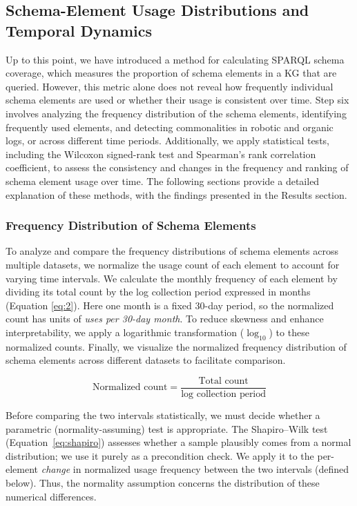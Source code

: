 \documentclass[sw]{iosart2x}
\begin{document}
\subsection{Schema-Element Usage Distributions and Temporal Dynamics}\label{sec:s6}
Up to this point, we have introduced a method for calculating SPARQL schema coverage, which measures the proportion of schema elements in a KG that are queried. However, this metric alone does not reveal how frequently individual schema elements are used or whether their usage is consistent over time. Step six involves analyzing the frequency distribution of the schema elements, identifying frequently used elements, and detecting commonalities in robotic and organic logs, or across different time periods. Additionally, we apply statistical tests, including the Wilcoxon signed-rank test and Spearman's rank correlation coefficient, to assess the consistency and changes in the frequency and ranking of schema element usage over time. The following sections provide a detailed explanation of these methods, with the findings presented in the Results section.

\subsubsection{Frequency Distribution of Schema Elements}\label{sec:s61}
To analyze and compare the frequency distributions of schema elements across multiple datasets, we normalize the usage count of each element to account for varying time intervals. We calculate the monthly frequency of each element by dividing its total count by the log collection period expressed in months (Equation \ref{eq:2}). Here one month is a fixed 30-day period, so the normalized count has units of \emph{uses per 30-day month}. To reduce skewness and enhance interpretability, we apply a logarithmic transformation ($\log_{10}$) to these normalized counts. Finally, we visualize the normalized frequency distribution of schema elements across different datasets to facilitate comparison.

\begin{equation}
\text{Normalized count} = \frac{\text{Total count}}{\text{log collection period}}
\label{eq:2}
\end{equation}

Before comparing the two intervals statistically, we must decide whether a parametric (normality-assuming) test is appropriate. The Shapiro--Wilk test (Equation~\ref{eq:shapiro}) assesses whether a sample plausibly comes from a normal distribution; we use it purely as a precondition check. We apply it to the per-element \emph{change} in normalized usage frequency between the two intervals (defined below). Thus, the normality assumption concerns the distribution of these numerical differences.
\end{document}
